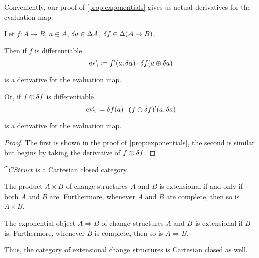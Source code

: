Conveniently, our proof of \ref{prop:exponentials} gives us actual derivatives for the evaluation map:

\begin{prop}
\label{prop:evDerivatives}
  Let $f: A \rightarrow B$, $a \in A$, $\delta a \in
  \Delta A$, $\delta f \in \Delta (A \rightarrow B)$.

  Then if $f$ is differentiable
  $$\operatorname{ev}'_1 \coloneqq f'(a, \delta a) \cdot \delta f(a \oplus \delta a)$$

  is a derivative for the evaluation map.
  
  Or, if $f \oplus \delta f$ is differentiable
  $$\operatorname{ev}'_2 \coloneqq \delta f(a) \cdot (f \oplus \delta f)'(a, \delta a)$$

  is a derivative for the evaluation map.
\end{prop}
\begin{proof}
  The first is shown in the proof of \ref{prop:exponentials}, the second is
  similar but begins by taking the derivative of $f \oplus \delta f$.
\end{proof}

\begin{corollary}
  $\cat{CStruct}$ is a Cartesian closed category.
\end{corollary}

\begin{lemma}
  The product $A \times B$ of change structures $A$ and $B$ is extensional if and only if both $A$ and $B$ are.
  Furthermore, whenever $A$ and $B$ are complete, then so is $A \times B$.

  The exponential object $A \Rightarrow B$ of change structures $A$ and $B$ is extensional if $B$ is. 
  Furthermore, whenever $B$ is complete, then so is $A \Rightarrow B$.
\end{lemma}

Thus, the category of extensional change structures is Cartesian closed as well.

